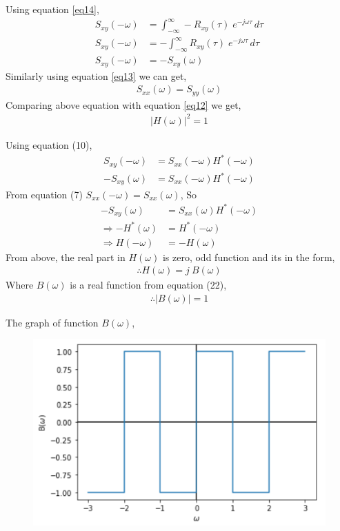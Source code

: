 \documentclass{beamer}
\begin{document}
\begin{frame}{}
    Using equation \eqref{eq14},
   \begin{align}
      S_{xy}(-\omega) &= \int_{-\infty}^{\infty} -R_{xy}(\tau)\; e^{-j\omega \tau} \, d\tau \\
      S_{xy}(-\omega) &= -\int_{-\infty}^{\infty} R_{xy}(\tau)\; e^{-j\omega \tau} \, d\tau \\
      S_{xy}(-\omega) &= -S_{xy}(\omega) 
   \end{align}
   Similarly using equation \eqref{eq13} we can get,
  \begin{align}
     S_{xx}(\omega)=S_{yy}(\omega)
  \end{align}
  Comparing above equation with equation \eqref{eq12} we get,
  \begin{align}
     |H(\omega)|^2 = 1
  \end{align}
         
\end{frame}
 

\begin{frame}{}
   Using equation (10),
   \begin{align}
      S_{xy}(-\omega) &= S_{xx}(-\omega)H^*(-\omega) \\
      -S_{xy}(\omega) &= S_{xx}(-\omega)H^*(-\omega)
   \end{align}  
     From equation (7) $S_{xx}(-\omega)=S_{xx}(\omega)$, So 
   \begin{align}
       -S_{xy}(\omega) &= S_{xx}(\omega)H^*(-\omega) \\
       \Rightarrow -H^*(\omega) &= H^*(-\omega) \\
       \Rightarrow H(-\omega) &= -H(\omega)
   \end{align}
    From above, the real part in $H(\omega)$ is zero, odd function and its in the form,
    \begin{align}
    		\therefore H(\omega) = j\:B(\omega)
    \end{align}
    Where $B(\omega)$ is a real function from equation (22),
    \begin{align}
    		\therefore |B(\omega)| = 1
    \end{align}
\end{frame}

\begin{frame}{}
	The graph of function $B(\omega)$,
	\begin{figure}[h!]
	  \centering 
	  \includegraphics[]{./figs/plot.png}
	  \caption{}
	  \label{Fig1}
  \end{figure}
\end{frame}
\end{document}
